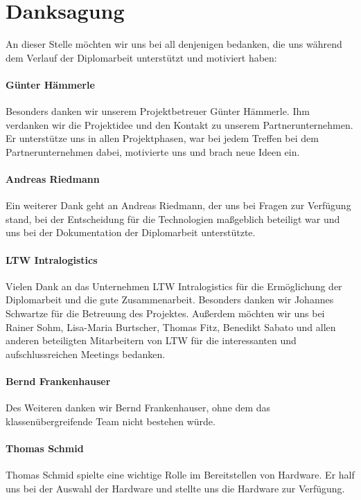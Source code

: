 \section*{Danksagung}

An dieser Stelle möchten wir uns bei all denjenigen bedanken, die uns während dem Verlauf der Diplomarbeit unterstützt und motiviert haben: \\

\paragraph*{Günter Hämmerle}
Besonders danken wir unserem Projektbetreuer Günter Hämmerle. Ihm verdanken wir die Projektidee und den Kontakt zu unserem Partnerunternehmen. Er unterstütze uns in allen Projektphasen, war bei jedem Treffen bei dem Partnerunternehmen dabei, motivierte uns und brach neue Ideen ein.

\paragraph*{Andreas Riedmann}
Ein weiterer Dank geht an Andreas Riedmann, der uns bei Fragen zur Verfügung stand, bei der Entscheidung für die Technologien maßgeblich beteiligt war und uns bei der Dokumentation der Diplomarbeit unterstützte.

\paragraph*{LTW Intralogistics}
Vielen Dank an das Unternehmen LTW Intralogistics für die Ermöglichung der Diplomarbeit und die gute Zusammenarbeit. Besonders danken wir Johannes Schwartze für die Betreuung des Projektes. Außerdem möchten wir uns bei Rainer Sohm, Lisa-Maria Burtscher, Thomas Fitz, Benedikt Sabato und allen anderen beteiligten Mitarbeitern von LTW für die interessanten und aufschlussreichen Meetings bedanken.

\paragraph*{Bernd Frankenhauser}
Des Weiteren danken wir Bernd Frankenhauser, ohne dem das klassenübergreifende Team nicht bestehen würde.

\paragraph*{Thomas Schmid}
Thomas Schmid spielte eine wichtige Rolle im Bereitstellen von Hardware. Er half uns bei der Auswahl der Hardware und stellte uns die Hardware zur Verfügung.

